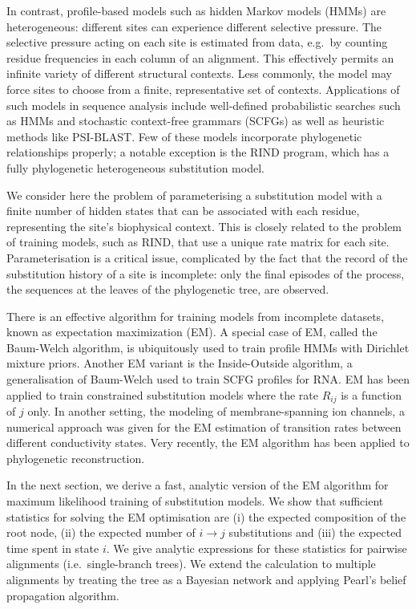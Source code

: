 \documentclass[12pt]{article}
\begin{document}
In contrast, profile-based models such as hidden Markov models (HMMs) are heterogeneous: different
sites can experience different selective pressure. The selective pressure acting on each site is
estimated from data, e.g.\ by counting residue frequencies in each column of an alignment. This
effectively permits an infinite variety of different structural contexts. Less commonly, the model
may force sites to choose from a finite, representative set of contexts.\cite{Felsenstein1996,Yang1995}
Applications of such models in sequence analysis include well-defined probabilistic searches such as
HMMs and stochastic context-free grammars (SCFGs)\cite{Durbin1998} as well as heuristic methods
like PSI-BLAST.\cite{Altschul1997} Few of these models incorporate phylogenetic relationships
properly; a notable exception is the RIND program,\cite{Bruno1996,Halpern1998} which has a fully
phylogenetic heterogeneous substitution model.

We consider here the problem of parameterising a substitution model with a finite number of hidden
states that can be associated with each residue, representing the site's biophysical
context.\cite{Dimmic2000,Koshi2001} This is closely related to the problem of training models,
such as RIND, that use a unique rate matrix for each site. Parameterisation is a critical issue,
complicated by the fact that the record of the substitution history of a site is incomplete: only
the final episodes of the process, the sequences at the leaves of the phylogenetic tree, are observed.

There is an effective algorithm for training models from incomplete datasets, known as expectation
maximization (EM).\cite{Dempster1977} A special case of EM, called the Baum-Welch algorithm, is
ubiquitously used to train profile HMMs with Dirichlet mixture priors.\cite{Brown1993} Another EM
variant is the Inside-Outside algorithm, a generalisation of Baum-Welch used to train SCFG profiles
for RNA.\cite{Durbin1998} EM has been applied to train constrained substitution models where the
rate $R_{ij}$ is a function of $j$ only.\cite{Bruno1996} In another setting, the modeling of
membrane-spanning ion channels, a numerical approach was given for the EM estimation of transition
rates between different conductivity states.\cite{Michalek1999} Very recently, the EM algorithm has
been applied to phylogenetic reconstruction.\cite{Friedman2001}

In the next section, we derive a fast, analytic version of the EM algorithm for maximum likelihood
training of substitution models. We show that sufficient statistics for solving the EM optimisation
are (i) the expected composition of the root node, (ii) the expected number of $i \to j$
substitutions and (iii) the expected time spent in state $i$. We give analytic expressions for these
statistics for pairwise alignments (i.e.\ single-branch trees). We extend the calculation to multiple
alignments by treating the tree as a Bayesian network and applying Pearl's belief propagation
algorithm.\cite{Pearl1988}
\end{document}
